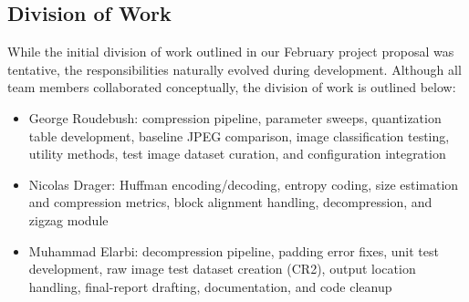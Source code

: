 \subsection{Division of Work}
\label{sec:division-of-work}

While the initial division of work outlined in our February project proposal was tentative, the responsibilities naturally evolved during development. Although all team members collaborated conceptually, the division of work is outlined below:
\begin{itemize}
  \item George Roudebush: compression pipeline, parameter sweeps, quantization table development, baseline JPEG comparison, image classification testing, utility methods, test image dataset curation, and configuration integration
  \item Nicolas Drager: Huffman encoding/decoding, entropy coding, size estimation and compression metrics, block alignment handling, decompression, and zigzag module
  \item Muhammad Elarbi: decompression pipeline, padding error fixes, unit test development, raw image test dataset creation (CR2), output location handling, final-report drafting, documentation, and code cleanup
\end{itemize}